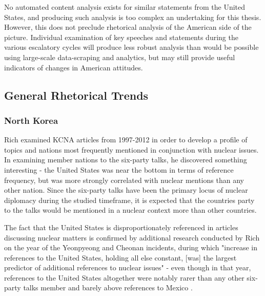 \documentclass{article}
\begin{document}
No automated content analysis exists for similar statements from the United States, and producing such analysis is too complex an undertaking for this thesis. However, this does not preclude rhetorical analysis of the American side of the picture. Individual examination of key speeches and statements during the various escalatory cycles will produce less robust analysis than would be possible using large-scale data-scraping and analytics, but may still provide useful indicators of changes in American attitudes.



\subsection{General Rhetorical Trends}
\subsubsection{North Korea}

Rich \cite{rich14} examined KCNA articles from 1997-2012 in order to develop a profile of topics and nations most frequently mentioned in conjunction with nuclear issues. In examining member nations to the six-party talks, he discovered something interesting -  the United States was near the bottom in terms of reference frequency, but was more strongly correlated with nuclear mentions than any other nation. Since the six-party talks have been the primary locus of nuclear diplomacy during the studied timeframe, it is expected that the countries party to the talks would be mentioned in a nuclear context more than other countries.

The fact that the United States is disproportionately referenced in articles discussing nuclear matters is confirmed by additional research conducted by Rich on the year of the Yeonpyeong and Cheonan incidents, during which "increase in references to the United States, holding all else constant, [was] the largest predictor of additional references to nuclear issues" - even though in that year, references to the United States altogether were notably rarer than any other six-party talks member and barely above references to Mexico \cite{rich12}.
\end{document}
